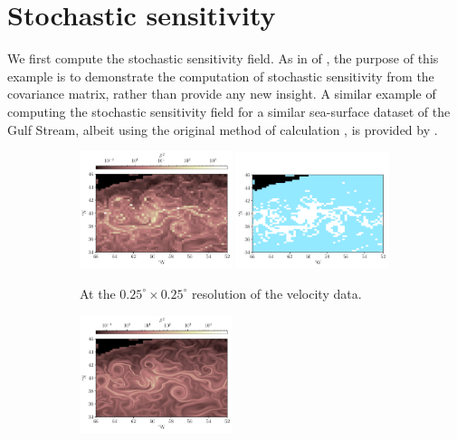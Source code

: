 \section{Stochastic sensitivity}
We first compute the stochastic sensitivity field.
As in  of , the purpose of this example is to demonstrate the computation of stochastic sensitivity from the covariance matrix, rather than provide any new insight.
A similar example of computing the stochastic sensitivity field for a similar sea-surface dataset of the Gulf Stream, albeit using the original method of calculation \citep{Balasuriya_2020_StochasticSensitivityComputable}, is provided by \citet{BadzaEtAl_2023_HowSensitiveAre}.

\begin{figure}
	\centering
	\begin{subfigure}{\textwidth}
		\includegraphics[width=0.49\textwidth]{chp06_applications/figures/gulf_stream/S2_field_grid}
		\includegraphics[width=0.49\textwidth]{chp06_applications/figures/gulf_stream/S2_robust_grid_2.0}
		\caption{At the \(0.25^\circ \times 0.25^\circ\) resolution of the velocity data.}
		\label{fig:na_s2_grid}
	\end{subfigure}
	\begin{subfigure}{\textwidth}
		\includegraphics[width=0.49\textwidth]{chp06_applications/figures/gulf_stream/S2_field_high}

\end{subfigure}
\end{figure}
